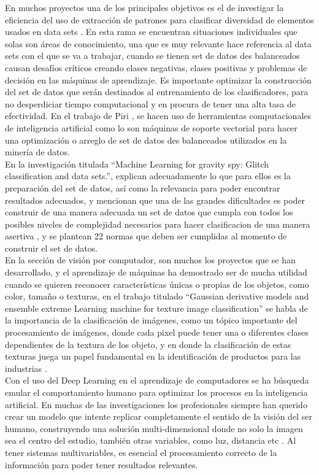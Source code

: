 \documentclass[conference]{IEEEtran}
\begin{document}
En muchos proyectos una de los principales objetivos es el de investigar la eficiencia del uso de extracción de patrones para clasificar diversidad de elementos usados en data sets \cite{b2}. En esta rama se encuentran situaciones individuales que solas son áreas de conocimiento, una que es muy relevante hace referencia al data sets con el que se va a trabajar, cuando se tienen set de datos des balanceados causan desafíos críticos creando clases negativas, clases positivas y problemas de decisión en las máquinas de aprendizaje\cite{b3}. Es  importante optimizar la construcción del set de datos que serán destinados al entrenamiento de los clasificadores,  para no desperdiciar tiempo computacional y en procura de tener una alta tasa de efectividad. En el trabajo de Piri  \cite{b3}, se hacen uso de herramientas computacionales de inteligencia artificial como lo son máquinas de soporte vectorial para hacer una optimización o arreglo de set de datos des balanceados utilizados en la minería de datos.\\

En la investigación titulada “Machine Learning for gravity spy: Glitch classification and data sets.”, explican adecuadamente lo que para ellos es la preparación del set de datos, así como la relevancia para poder encontrar resultados adecuados, y mencionan que una de las grandes dificultades es poder construir de una manera adecuada un set de datos que cumpla con todos los posibles niveles de complejidad necesarios para hacer clasificacion de una manera asertiva \cite{b4}, y se plantean 22 normas que deben ser cumplidas al momento de construir el set de datos. \\

En la sección de visión por computador, son muchos los proyectos que se han desarrollado, y el aprendizaje de máquinas ha demostrado ser de mucha utilidad cuando se quieren reconocer características únicas o propias de los objetos, como color, tamaño o texturas, en el trabajo titulado “Gaussian derivative models and ensemble extreme Learning machine for texture image classification” se habla de la importancia de la clasificación de imágenes, como un tópico importante del procesamiento de imágenes, donde cada pixel puede tener una o diferentes clases dependientes de la textura de los objeto, y en donde la clasificación de estas texturas juega un papel fundamental en la identificación de productos para las industrias \cite{b5}.\\

Con el uso del Deep Learning en el aprendizaje de computadores se ha búsqueda emular el comportamiento humano para optimizar los procesos en la inteligencia artificial. En muchas de las investigaciones los profesionales siempre han querido crear un modelo que intente replicar completamente el sentido de la visión del ser humano, construyendo una solución multi-dimensional donde no solo la imagen sea el centro del estudio, también otras variables, como luz, distancia etc \cite{b6}. Al tener sistemas multivariables, es esencial el procesamiento correcto de la información para poder tener resultados relevantes.\\
\end{document}
